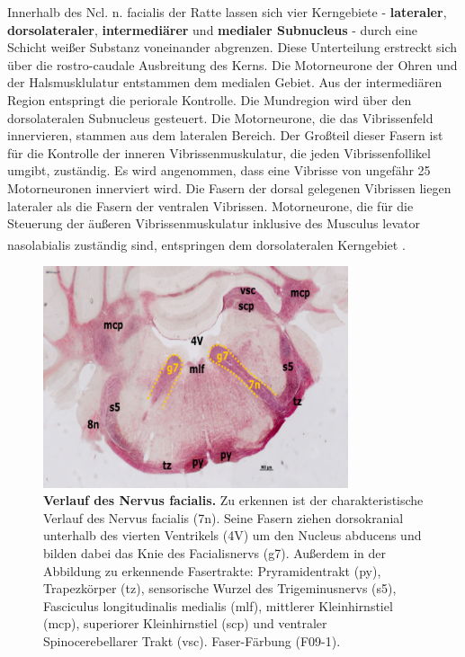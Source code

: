 \documentclass[12pt,a4paper,pdftex]{article}
\begin{document}
Innerhalb des Ncl. n. facialis der Ratte lassen sich vier Kerngebiete - \textbf{lateraler}, \textbf{dorsolateraler}, \textbf{intermediärer} und \textbf{medialer Subnucleus} - durch eine Schicht weißer Substanz voneinander abgrenzen. Diese Unterteilung erstreckt sich über die rostro-caudale Ausbreitung des Kerns. Die Motorneurone der Ohren und der Halsmusklulatur entstammen dem medialen Gebiet. Aus der intermediären Region entspringt die periorale Kontrolle. Die Mundregion wird über den dorsolateralen Subnucleus gesteuert. Die Motorneurone, die das Vibrissenfeld innervieren, stammen aus dem lateralen Bereich. Der Großteil dieser Fasern ist für die Kontrolle der inneren Vibrissenmuskulatur, die jeden Vibrissenfollikel umgibt, zuständig. Es wird angenommen, dass eine Vibrisse von ungefähr 25 Motorneuronen innerviert wird. Die Fasern der dorsal gelegenen Vibrissen liegen lateraler als die Fasern der ventralen Vibrissen. Motorneurone, die für die Steuerung der äußeren Vibrissenmuskulatur inklusive des Musculus levator nasolabialis	zuständig sind, entspringen dem dorsolateralen Kerngebiet \textsuperscript{\cite[11]{paxinos2014rat}}.   


\begin{figure}[H]
    \centering
    \includegraphics[width=0.8\textwidth]{pictures/Bilder_Laura/facialis_Nerv_F09_1png.png}
    \caption[Verlauf des Nervus facialis]{\textbf{Verlauf des Nervus facialis.} Zu erkennen ist der charakteristische Verlauf des Nervus facialis (7n). Seine Fasern ziehen dorsokranial unterhalb des vierten Ventrikels (4V) um den Nucleus abducens und bilden dabei das Knie des Facialisnervs (g7). Außerdem in der Abbildung zu erkennende Fasertrakte: Pryramidentrakt (py), Trapezkörper (tz), sensorische Wurzel des Trigeminusnervs (s5), Fasciculus longitudinalis medialis (mlf), mittlerer Kleinhirnstiel (mcp), superiorer Kleinhirnstiel (scp) und ventraler Spinocerebellarer Trakt (vsc). Faser-Färbung (F09-1).}
    \label{fig:nervus-facialis}
\end{figure}
\end{document}
